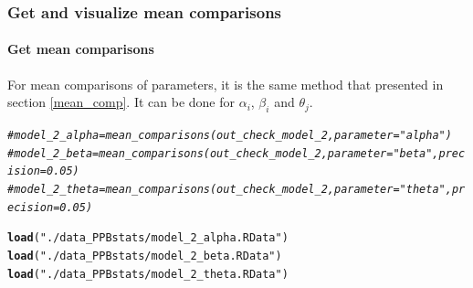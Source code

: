 \documentclass{article}\usepackage[]{graphicx}\usepackage[]{color}
\makeatletter
\newcommand{\hlstr}[1]{\textcolor[rgb]{0.192,0.494,0.8}{#1}}%
\newcommand{\hlcom}[1]{\textcolor[rgb]{0.678,0.584,0.686}{\textit{#1}}}%
\newcommand{\hlopt}[1]{\textcolor[rgb]{0,0,0}{#1}}%
\newcommand{\hlstd}[1]{\textcolor[rgb]{0.345,0.345,0.345}{#1}}%
\newcommand{\hlkwd}[1]{\textcolor[rgb]{0.737,0.353,0.396}{\textbf{#1}}}%
\newenvironment{kframe}{%
 \def\at@end@of@kframe{}%
 \ifinner\ifhmode%
  \def\at@end@of@kframe{\end{minipage}}%
  \begin{minipage}{\columnwidth}%
 \fi\fi%
 \def\FrameCommand##1{\hskip\@totalleftmargin \hskip-\fboxsep
 \colorbox{shadecolor}{##1}\hskip-\fboxsep
     \hskip-\linewidth \hskip-\@totalleftmargin \hskip\columnwidth}%
 \MakeFramed {\advance\hsize-\width
   \@totalleftmargin\z@ \linewidth\hsize
   \@setminipage}}%
 {\par\unskip\endMakeFramed%
 \at@end@of@kframe}
\newenvironment{knitrout}{}{} %
\makeatother
\begin{document}


\subsubsection{Get and visualize mean comparisons}

\paragraph{Get mean comparisons}

For mean comparisons of parameters, it is the same method that presented in section \ref{mean_comp}.
It can be done for $\alpha_i$, $\beta_i$ and $\theta_j$.

\begin{knitrout}
\color{fgcolor}\begin{kframe}
\begin{alltt}
\hlcom{# model_2_alpha = mean_comparisons(out_check_model_2, parameter = "alpha")}
\hlcom{# model_2_beta = mean_comparisons(out_check_model_2, parameter = "beta", precision = 0.05)}
\hlcom{# model_2_theta = mean_comparisons(out_check_model_2, parameter = "theta", precision = 0.05)}

\hlkwd{load}\hlstd{(}\hlstr{"./data_PPBstats/model_2_alpha.RData"}\hlstd{)}
\hlkwd{load}\hlstd{(}\hlstr{"./data_PPBstats/model_2_beta.RData"}\hlstd{)}
\hlkwd{load}\hlstd{(}\hlstr{"./data_PPBstats/model_2_theta.RData"}\hlstd{)}
\end{alltt}
\end{kframe}
\end{knitrout}
\end{document}
